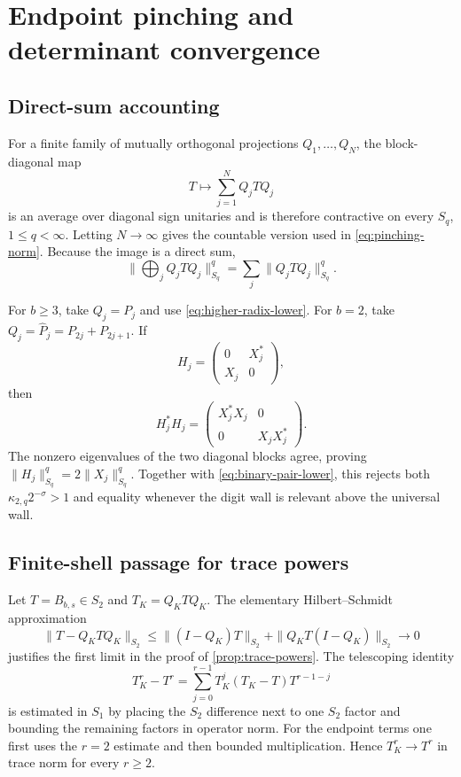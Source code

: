 \section{Endpoint pinching and determinant convergence}
\label{app:endpoint}

\subsection{Direct-sum accounting}

For a finite family of mutually orthogonal projections \(Q_1,\ldots,Q_N\),
the block-diagonal map
\[
  T\longmapsto\sum_{j=1}^{N}Q_jTQ_j
\]
is an average over diagonal sign unitaries and is therefore contractive on
every \(S_q\), \(1\le q<\infty\).  Letting \(N\to\infty\) gives the
countable version used in \cref{eq:pinching-norm}.  Because the image is a
direct sum,
\[
  \|\bigoplus_jQ_jTQ_j\|_{S_q}^q
  =\sum_j\|Q_jTQ_j\|_{S_q}^q.
\]

For \(b\ge3\), take \(Q_j=P_j\) and use
\cref{eq:higher-radix-lower}.  For \(b=2\), take
\(Q_j=\widehat P_j=P_{2j}+P_{2j+1}\).  If
\[
  H_j=
  \begin{pmatrix}0&X_j^*\\X_j&0\end{pmatrix},
\]
then
\[
  H_j^*H_j
  =
  \begin{pmatrix}X_j^*X_j&0\\0&X_jX_j^*\end{pmatrix}.
\]
The nonzero eigenvalues of the two diagonal blocks agree, proving
\(\|H_j\|_{S_q}^q=2\|X_j\|_{S_q}^q\).  Together with
\cref{eq:binary-pair-lower}, this rejects both
\(\kappa_{2,q}2^{-\sigma}>1\) and equality whenever the digit wall is
relevant above the universal wall.

\subsection{Finite-shell passage for trace powers}

Let \(T=B_{b,s}\in S_2\) and \(T_K=Q_KTQ_K\).  The elementary
Hilbert--Schmidt approximation
\[
  \|T-Q_KTQ_K\|_{S_2}
  \le
  \|(I-Q_K)T\|_{S_2}+\|Q_KT(I-Q_K)\|_{S_2}
  \longrightarrow0
\]
justifies the first limit in the proof of
\cref{prop:trace-powers}.  The telescoping identity
\[
  T_K^r-T^r
  =
  \sum_{j=0}^{r-1}T_K^j(T_K-T)T^{r-1-j}
\]
is estimated in \(S_1\) by placing the \(S_2\) difference next to one
\(S_2\) factor and bounding the remaining factors in operator norm.  For
the endpoint terms one first uses the \(r=2\) estimate and then bounded
multiplication.  Hence \(T_K^r\to T^r\) in trace norm for every \(r\ge2\).

